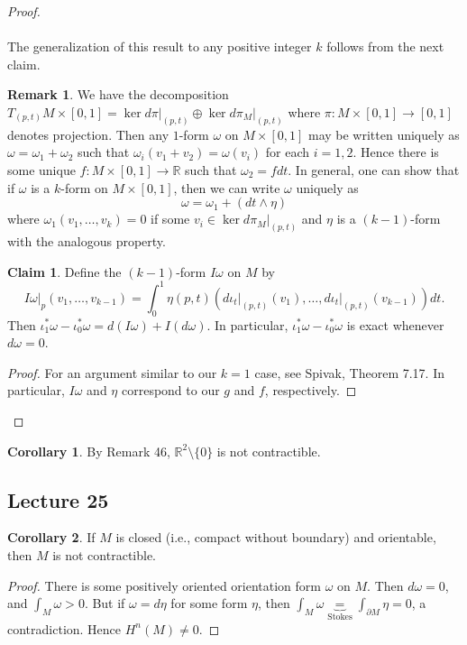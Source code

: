 \documentclass[10pt,letterpaper,cm]{nupset}
\theoremstyle{definition}
\newtheorem{claim}{Claim}
\newtheorem{remark}{Remark}
\newtheorem{corollary}{Corollary}
\newcommand{\R}{\mathbb R}
\newcommand{\1}{\mathbf{1}}
\newcommand{\0}{\vec 0}
\begin{document}
\begin{proof}
\\ \\
The generalization of this result to any positive integer $k$ follows from the next claim.
\begin{remark}
We have the decomposition $T_{(p,t)}M \times [0,1] = \ker d\pi\rvert_{(p,t)} \oplus \ker d\pi_M\rvert_{(p,t)}$ where $\pi: M \times [0,1]\to [0,1]$ denotes projection. Then any $1$-form $\omega$ on $M \times [0,1]$ may be written uniquely as $\omega = \omega_1 + \omega_2$ such that $\omega_i(v_1 + v_2) = \omega(v_i)$ for each $i=1, 2$. Hence there is some unique $f : M \times [0,1] \to \R$ such that $\omega_2 = f dt$. In general, one can show that if $\omega$ is a $k$-form on $M \times [0,1]$, then we can write $\omega$ uniquely as $$\omega = \omega_1 + (dt \wedge \eta)$$ where $\omega_1(v_1, \ldots, v_k) =0$ if some $v_i \in  \ker d\pi_M\rvert_{(p,t)}$ and $\eta$ is a $(k-1)$-form with the analogous property.
\end{remark}
\begin{claim}
Define the $(k-1)$-form $I\omega$ on $M$ by $$I \omega \rvert_p(v_1, \ldots, v_{k-1}) = \int_0^1 \eta(p, t)(d\iota_t\rvert_{(p,t)}(v_1), \ldots, d\iota_t\rvert_{(p,t)}(v_{k-1}))dt   .$$ Then $\iota^{\ast}_1\omega  - \iota^{\ast}_0 \omega = d(I\omega) + I(d\omega)$. In particular, $\iota^{\ast}_1\omega  - \iota^{\ast}_0 \omega$ is exact whenever $d\omega =0$.
\end{claim}
\begin{proof}
For an argument similar to our $k=1$ case,  see Spivak, Theorem 7.17. In particular, $I\omega$ and $\eta$ correspond to our $g$ and $f$, respectively.
\end{proof}

\end{proof}

\begin{corollary}
By Remark 46, $\R^2\setminus \{0\}$ is not contractible.
\end{corollary}

\subsection{Lecture 25}

\begin{corollary}
If $M$ is closed (i.e., compact without boundary) and orientable, then $M$ is not contractible.
\end{corollary}
\begin{proof}
There is some positively oriented orientation form $\omega$ on $M$. Then $d\omega =0$, and $\int_M \omega >0$. But if $\omega = d \eta$ for some form $\eta$, then $\int_M \omega \underbrace{=}_{\text{Stokes}} \int_{\partial{M}} \eta =0$, a contradiction. Hence $H^n(M) \ne 0$.
\end{proof}
\end{document}
